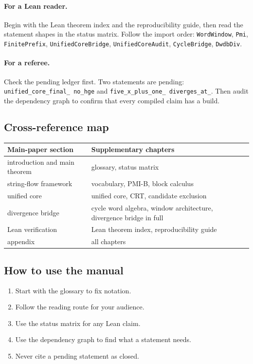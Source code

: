 \paragraph{For a Lean reader.}
Begin with the Lean theorem index and the reproducibility guide, then
read the statement shapes in the status matrix.  Follow the import
order: \texttt{WordWindow}, \texttt{Pmi}, \texttt{FinitePrefix},
\texttt{UnifiedCoreBridge}, \texttt{UnifiedCoreAudit},
\texttt{CycleBridge}, \texttt{DwdbDiv}.

\paragraph{For a referee.}
Check the pending ledger first.  Two statements are pending:
\texttt{unified\_\allowbreak core\_\allowbreak final\_\allowbreak
no\_\allowbreak hge} and
\texttt{five\_\allowbreak x\_\allowbreak plus\_\allowbreak one\_\allowbreak
diverges\_\allowbreak at\_}.  Then audit the dependency
graph to confirm that every compiled claim has a build.

\subsection{Cross-reference map}

\begin{center}
\small
\begin{tabular}{@{}p{}p{}@{}}
\toprule
Main-paper section & Supplementary chapters \\
\midrule
introduction and main theorem & glossary, status matrix \\
string-flow framework & vocabulary, PMI-B, block calculus \\
unified core & unified core, CRT, candidate exclusion \\
divergence bridge & cycle word algebra, window architecture,
  divergence bridge in full \\
Lean verification & Lean theorem index, reproducibility guide \\
appendix & all chapters \\
\bottomrule
\end{tabular}
\end{center}

\subsection{How to use the manual}

\begin{enumerate}[leftmargin=*]
\item Start with the glossary to fix notation.
\item Follow the reading route for your audience.
\item Use the status matrix for any Lean claim.
\item Use the dependency graph to find what a statement needs.
\item Never cite a pending statement as closed.
\end{enumerate}
